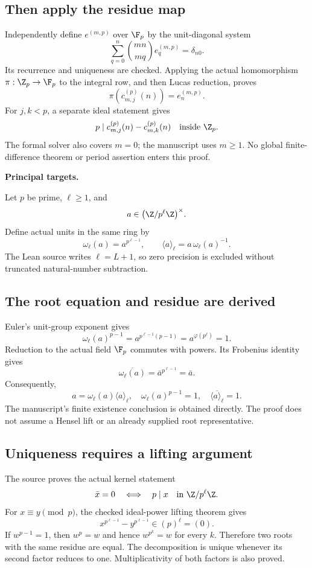 \subsection*{Then apply the residue map}
Independently define $e^{(m,p)}$ over $\F_p$ by the unit-diagonal system
\[
 \sum_{q=0}^{n}\binom{mn}{mq}e^{(m,p)}_q=\delta_{n0}.
\]
Its recurrence and uniqueness are checked. Applying the actual homomorphism $\pi:\Z_p\to\F_p$ to the integral row, and then Lucas reduction, proves
\[
 \boxed{\pi(c^{(p)}_{m,j}(n))=e^{(m,p)}_n.}
\]
For $j,k<p$, a separate ideal statement gives
\[
 p\mid c^{(p)}_{m,j}(n)-c^{(p)}_{m,k}(n)\quad\text{inside }\Z_p.
\]
The formal solver also covers $m=0$; the manuscript uses $m\geq1$. No global finite-difference theorem or period assertion enters this proof.

\textbf{Principal targets.}\par
{}\par
{}\par
{}
\par\medskip
{}
Let $p$ be prime, $\ell\geq1$, and
\[
 a\in\bigl(\Z/p^\ell\Z\bigr)^\times.
\]
Define actual units in the same ring by
\[
 \boxed{\omega_\ell(a)=a^{p^{\ell-1}},\qquad
 \langle a\rangle_\ell=a\,\omega_\ell(a)^{-1}.}
\]
The Lean source writes $\ell=L+1$, so zero precision is excluded without truncated natural-number subtraction.

\subsection*{The root equation and residue are derived}
Euler's unit-group exponent gives
\[
 \omega_\ell(a)^{p-1}
 =a^{p^{\ell-1}(p-1)}=a^{\varphi(p^\ell)}=1.
\]
Reduction to the actual field $\F_p$ commutes with powers. Its Frobenius identity gives
\[
 \overline{\omega_\ell(a)}
 =\bar a^{p^{\ell-1}}=\bar a.
\]
Consequently,
\[
 \boxed{a=\omega_\ell(a)\langle a\rangle_\ell,\quad
 \omega_\ell(a)^{p-1}=1,\quad
 \overline{\langle a\rangle_\ell}=1.}
\]
The manuscript's finite existence conclusion is obtained directly. The proof does not assume a Hensel lift or an already supplied root representative.

\subsection*{Uniqueness requires a lifting argument}
The source proves the actual kernel statement
\[
 \bar x=0\quad\Longleftrightarrow\quad p\mid x
 \quad\text{in }\Z/p^\ell\Z.
\]
For $x\equiv y\pmod p$, the checked ideal-power lifting theorem gives
\[
 x^{p^{\ell-1}}-y^{p^{\ell-1}}\in(p)^\ell=(0).
\]
If $w^{p-1}=1$, then $w^p=w$ and hence $w^{p^k}=w$ for every $k$. Therefore two roots with the same residue are equal. The decomposition is unique whenever its second factor reduces to one. Multiplicativity of both factors is also proved.

